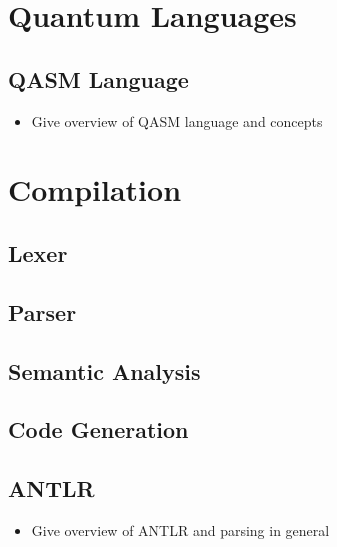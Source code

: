 \section{Quantum Languages}

\subsection{QASM Language}
\begin{itemize}
    \item Give overview of QASM language and concepts
\end{itemize}

\section{Compilation}

\subsection{Lexer}

\subsection{Parser}

\subsection{Semantic Analysis}

\subsection{Code Generation}

\subsection{ANTLR}
\begin{itemize}
    \item Give overview of ANTLR and parsing in general
\end{itemize}